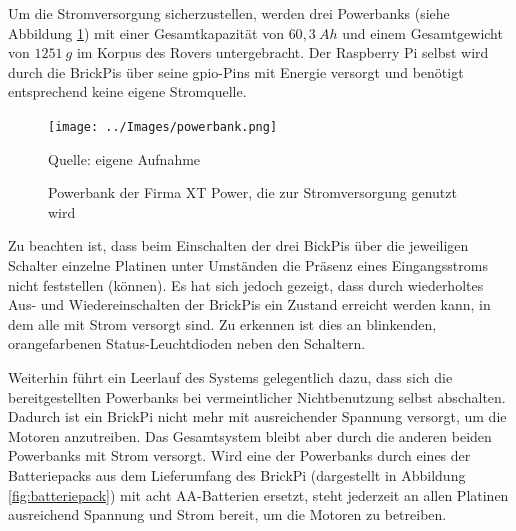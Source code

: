 Um die Stromversorgung sicherzustellen, werden drei Powerbanks (siehe Abbildung \ref{fig:powerbank}) mit einer Gesamtkapazität von $60{,}3\ Ah$ und einem Gesamtgewicht von $1251\ g$ im Korpus des Rovers untergebracht.
Der Raspberry Pi selbst wird durch die BrickPis über seine \acs{gpio}-Pins mit Energie versorgt \cite{cole2013} und benötigt entsprechend keine eigene Stromquelle.

\begin{figure}
	\centering
	\texttt{[image: ../Images/powerbank.png]}
	\vspace{0.5em}
	\parbox[c]{0.8\linewidth}{\footnotesize
		\centering
		\vspace{1em}
		Quelle: eigene Aufnahme
	}
	\captionsetup{format=plain}
	\caption{Powerbank der Firma XT Power, die zur Stromversorgung genutzt wird}
	\label{fig:powerbank}
\end{figure}

Zu beachten ist, dass beim Einschalten der drei BickPis über die jeweiligen Schalter einzelne Platinen unter Umständen die Präsenz eines Eingangsstroms nicht feststellen (können).
Es hat sich jedoch gezeigt, dass durch wiederholtes Aus- und Wiedereinschalten der BrickPis ein Zustand erreicht werden kann, in dem alle mit Strom versorgt sind.
Zu erkennen ist dies an blinkenden, orangefarbenen Status-Leuchtdioden neben den Schaltern.

Weiterhin führt ein Leerlauf des Systems gelegentlich dazu, dass sich die bereitgestellten Powerbanks bei vermeintlicher Nichtbenutzung selbst abschalten.
Dadurch ist ein BrickPi nicht mehr mit ausreichender Spannung versorgt, um die Motoren anzutreiben.
Das Gesamtsystem bleibt aber durch die anderen beiden Powerbanks mit Strom versorgt.
Wird eine der Powerbanks durch eines der Batteriepacks aus dem Lieferumfang des BrickPi (dargestellt in Abbildung \ref{fig:batteriepack}) mit acht AA-Batterien ersetzt, steht jederzeit an allen Platinen ausreichend Spannung und Strom bereit, um die Motoren zu betreiben.


